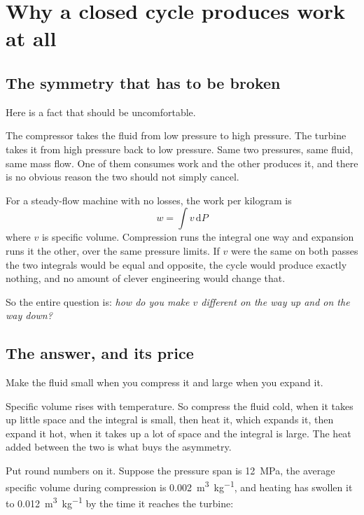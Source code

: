 \documentclass[11pt,a4paper]{report}
\begin{document}
\chapter{Why a closed cycle produces work at all}
\label{ch:work}

\section{The symmetry that has to be broken}

Here is a fact that should be uncomfortable.

The compressor takes the fluid from low pressure to high pressure. The
turbine takes it from high pressure back to low pressure. Same two
pressures, same fluid, same mass flow. One of them consumes work and the
other produces it, and there is no obvious reason the two should not simply
cancel.

For a steady-flow machine with no losses, the work per kilogram is
\begin{equation}
  w = \int v \, \mathrm{d}P
  \label{eq:vdp}
\end{equation}
where $v$ is specific volume. Compression runs the integral one way and
expansion runs it the other, over the same pressure limits. If $v$ were the
same on both passes the two integrals would be equal and opposite, the cycle
would produce exactly nothing, and no amount of clever engineering would
change that.

So the entire question is: \emph{how do you make $v$ different on the way up
and on the way down?}

\section{The answer, and its price}

Make the fluid small when you compress it and large when you expand it.

Specific volume rises with temperature. So compress the fluid cold, when it
takes up little space and the integral is small, then heat it, which
expands it, then expand it hot, when it takes up a lot of space and the
integral is large. The heat added between the two is what buys the asymmetry.

Put round numbers on it. Suppose the pressure span is
\SI{12}{\mega\pascal}, the average specific volume during compression is
\SI{0.002}{\metre\cubed\per\kilogram}, and heating has swollen it to
\SI{0.012}{\metre\cubed\per\kilogram} by the time it reaches the turbine:
\end{document}
